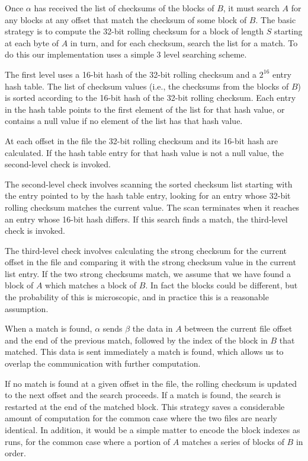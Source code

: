 \documentclass[a4paper]{article}
\begin{document}
Once $\alpha$ has received the list of checksums of the blocks of $B$,
it must search $A$ for any blocks at any offset that match the
checksum of some block of $B$.  The basic strategy is to compute the
32-bit rolling checksum for a block of length $S$ starting at each
byte of $A$ in turn, and for each checksum, search the list for a
match.  To do this our implementation uses a
simple 3 level searching scheme.

The first level uses a 16-bit hash of the 32-bit rolling checksum and
a $2^{16}$ entry hash table.  The list of checksum values (i.e., the
checksums from the blocks of $B$) is sorted according to the 16-bit
hash of the 32-bit rolling checksum.  Each entry in the hash table
points to the first element of the list for that hash value, or
contains a null value if no element of the list has that hash value.

At each offset in the file the 32-bit rolling checksum and its 16-bit
hash are calculated.  If the hash table entry for that hash value is
not a null value, the second-level check is invoked.

The second-level check involves scanning the sorted checksum list
starting with the entry pointed to by the hash table entry, looking
for an entry whose 32-bit rolling checksum matches the current value.
The scan terminates when it reaches an entry whose 16-bit hash
differs.  If this search finds a match, the third-level check is
invoked.

The third-level check involves calculating the strong checksum for the
current offset in the file and comparing it with the strong checksum
value in the current list entry.  If the two strong checksums match,
we assume that we have found a block of $A$ which matches a block of
$B$.  In fact the blocks could be different, but the probability of
this is microscopic, and in practice this is a reasonable assumption.

When a match is found, $\alpha$ sends $\beta$ the data in $A$ between
the current file offset and the end of the previous match, followed by
the index of the block in $B$ that matched.  This data is sent
immediately a match is found, which allows us to overlap the
communication with further computation.

If no match is found at a given offset in the file, the rolling
checksum is updated to the next offset and the search proceeds.  If a
match is found, the search is restarted at the end of the matched
block.  This strategy saves a considerable amount of computation for
the common case where the two files are nearly identical.  In
addition, it would be a simple matter to encode the block indexes as
runs, for the common case where a portion of $A$ matches a series of
blocks of $B$ in order.
\end{document}
